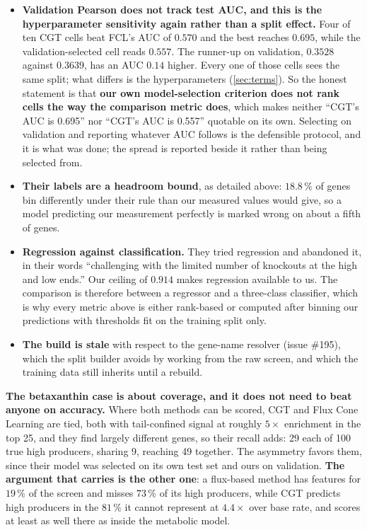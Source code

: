 \begin{itemize}
  Ours, by contrast, is the validation-selected cell with the comparison genes pinned out of
  training. \textbf{So where the two land level, we are level with an opponent selected on
  the test set.}
\item \textbf{Validation Pearson does not track test AUC, and this is the hyperparameter
  sensitivity again rather than a split effect.} Four of ten CGT cells beat FCL's AUC of
  $0.570$ and the best reaches $0.695$, while the validation-selected cell reads $0.557$.
  The runner-up on validation, $0.3528$ against $0.3639$, has an AUC $0.14$ higher. Every
  one of those cells sees the same split; what differs is the hyperparameters
  (\cref{sec:terms}). So the honest statement is that \textbf{our own model-selection
  criterion does not rank cells the way the comparison metric does}, which makes neither
  ``CGT's AUC is 0.695'' nor ``CGT's AUC is 0.557'' quotable on its own. Selecting on
  validation and reporting whatever AUC follows is the defensible protocol, and it is what
  was done; the spread is reported beside it rather than being selected from.
\item \textbf{Their labels are a headroom bound}, as detailed above: $18.8\,\%$ of genes bin
  differently under their rule than our measured values would give, so a model predicting
  our measurement perfectly is marked wrong on about a fifth of genes.
\item \textbf{Regression against classification.} They tried regression and abandoned it,
  in their words ``challenging with the limited number of knockouts at the high and low
  ends.'' Our ceiling of $0.914$ makes regression available to us. The comparison is
  therefore between a regressor and a three-class classifier, which is why every metric
  above is either rank-based or computed after binning our predictions with thresholds fit
  on the training split only.
\item \textbf{The build is stale} with respect to the gene-name resolver (issue \#195),
  which the split builder avoids by working from the raw screen, and which the training data
  still inherits until a rebuild.
\end{itemize}

\begin{keybox}
\textbf{The betaxanthin case is about coverage, and it does not need to beat anyone on
accuracy.} Where both methods can be scored, CGT and Flux Cone Learning are tied, both with
tail-confined signal at roughly $5\times$ enrichment in the top 25, and they find largely
different genes, so their recall adds: 29 each of 100 true high producers, sharing 9,
reaching 49 together. The asymmetry favors them, since their model was selected on its own
test set and ours on validation. \textbf{The argument that carries is the other one}: a
flux-based method has features for $19\,\%$ of the screen and misses $73\,\%$ of its high
producers, while CGT predicts high producers in the $81\,\%$ it cannot represent at
$4.4\times$ over base rate, and scores at least as well there as inside the metabolic model.
\end{keybox}

